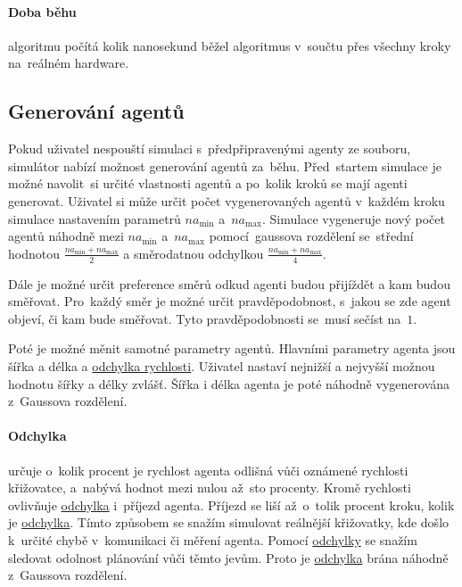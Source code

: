 \paragraph{Doba běhu}\label{par:doba_behu} algoritmu počítá kolik nanosekund běžel algoritmus
v~součtu přes všechny kroky na~reálném hardware.

\subsection{Generování agentů}\label{subsec:generovani_agentu}


Pokud uživatel nespouští simulaci s~předpřipravenými agenty ze souboru,
simulátor nabízí možnost generování agentů za~běhu.
Před~startem simulace je možné navolit~si určité vlastnosti agentů a po~kolik kroků se mají agenti generovat.
Uživatel si může určit počet vygenerovaných agentů v~každém kroku simulace nastavením parametrů $na_{\min}$ a~$na_{\max}$.
Simulace vygeneruje nový počet agentů náhodně mezi $na_{\min}$ a~$na_{\max}$
pomocí~gaussova rozdělení se~střední hodnotou $\frac{na_{\min} + na_{\max}}{2}$
a směrodatnou odchylkou $\frac{na_{\min} + na_{\max}}{4}$.

Dále je možné určit preference směrů odkud agenti budou přijíždět a kam budou směřovat.
Pro~každý směr je možné určit pravděpodobnost, s~jakou se zde agent objeví, či kam bude směřovat.
Tyto pravděpodobnosti se~musí sečíst na~$1$.

Poté je možné měnit samotné parametry agentů.
Hlavními parametry agenta jsou šířka a délka a \hyperref[par:odchylka]{odchylka rychlosti}.
Uživatel nastaví nejnižší a nejvyšší možnou hodnotu šířky a délky zvlášť.
Šířka i délka agenta je poté náhodně vygenerována z~Gaussova rozdělení.

\paragraph{Odchylka}\label{par:odchylka} určuje o~kolik procent je rychlost agenta odlišná
vůči oznámené rychlosti křižovatce, a~nabývá hodnot mezi nulou až~sto procenty.
Kromě rychlosti ovlivňuje \hyperref[par:odchylka]{odchylka} i~příjezd agenta.
Příjezd se liší až~o~tolik procent kroku, kolik je \hyperref[par:odchylka]{odchylka}.
Tímto způsobem se snažím simulovat reálnější křižovatky, kde došlo k~určité chybě v~komunikaci či měření agenta.
Pomocí \hyperref[par:odchylka]{odchylky} se snažím sledovat odolnost plánování vůči těmto jevům.
Proto je \hyperref[par:odchylka]{odchylka} brána náhodně z~Gaussova rozdělení.
